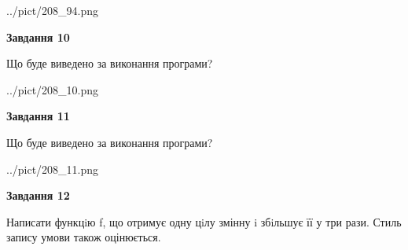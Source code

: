 \documentclass[12pt, ukrainian]{article}
\begin{document}
{\begin {large}
\begin{center}
	{../pict/208_94.png}
\end{center}
\newpage

{\begin {center}\textbf{Завдання 10}\end {center}}

Що буде виведено за виконання програми?\par
\begin{center}
	{../pict/208_10.png}
\end{center}
\newpage

{\begin {center}\textbf{Завдання 11}\end {center}}

Що буде виведено за виконання програми?\par
\begin{center}
	{../pict/208_11.png}
\end{center}
\newpage

{\begin {center}\textbf{Завдання 12}\end {center}}


Написати функцiю f, що отримує одну цiлу змінну i збiльшує її у три рази. Стиль запису умови також оцінюється.\par
\newpage

\end {large}}
\end{document}
